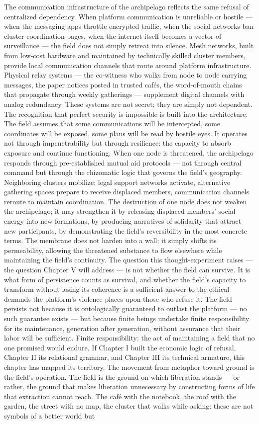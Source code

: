 The communication infrastructure of the archipelago reflects the same refusal of centralized dependency. When platform communication is unreliable or hostile — when the messaging apps throttle encrypted traffic, when the social networks ban cluster coordination pages, when the internet itself becomes a vector of surveillance — the field does not simply retreat into silence. Mesh networks, built from low-cost hardware and maintained by technically skilled cluster members, provide local communication channels that route around platform infrastructure. Physical relay systems — the co-witness who walks from node to node carrying messages, the paper notices posted in trusted cafés, the word-of-mouth chains that propagate through weekly gatherings — supplement digital channels with analog redundancy. These systems are not secret; they are simply not dependent. The recognition that perfect security is impossible is built into the architecture. The field assumes that some communications will be intercepted, some coordinates will be exposed, some plans will be read by hostile eyes. It operates not through impenetrability but through resilience: the capacity to absorb exposure and continue functioning. When one node is threatened, the archipelago responds through pre-established mutual aid protocols — not through central command but through the rhizomatic logic that governs the field’s geography. Neighboring clusters mobilize: legal support networks activate, alternative gathering spaces prepare to receive displaced members, communication channels reroute to maintain coordination. The destruction of one node does not weaken the archipelago; it may strengthen it by releasing displaced members’ social energy into new formations, by producing narratives of solidarity that attract new participants, by demonstrating the field’s reversibility in the most concrete terms. The membrane does not harden into a wall; it simply shifts its permeability, allowing the threatened substance to flow elsewhere while maintaining the field’s continuity. The question this thought-experiment raises — the question Chapter V will address — is not whether the field can survive. It is what form of persistence counts as survival, and whether the field’s capacity to transform without losing its coherence is a sufficient answer to the ethical demands the platform’s violence places upon those who refuse it. The field persists not because it is ontologically guaranteed to outlast the platform — no such guarantee exists — but because finite beings undertake finite responsibility for its maintenance, generation after generation, without assurance that their labor will be sufficient. Finite responsibility: the act of maintaining a field that no one promised would endure. If Chapter I built the economic logic of refusal, Chapter II its relational grammar, and Chapter III its technical armature, this chapter has mapped its territory. The movement from metaphor toward ground is the field’s operation. The field is the ground on which liberation stands — or rather, the ground that makes liberation unnecessary by constructing forms of life that extraction cannot reach. The café with the notebook, the roof with the garden, the street with no map, the cluster that walks while asking: these are not symbols of a better world but 